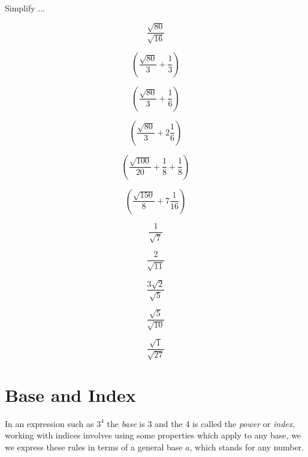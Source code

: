 Simplify ...

\begin{equation}
  \frac{\sqrt{80}}{\sqrt{16}}
\end{equation}

\begin{equation}
 \left ( \frac{\sqrt{80}}{3} + \frac{1}{3} \right)
\end{equation}

\begin{equation}
 \left ( \frac{\sqrt{80}}{3} + \frac{1}{6} \right)
\end{equation}

\begin{equation}
 \left (  \frac{\sqrt{80}}{3} + 2\frac{1}{6} \right )
\end{equation}

\begin{equation}
 \left (  \frac{\sqrt{100}}{20} + \frac{1}{8} + \frac{1}{8} \right )
\end{equation}

\begin{equation}
 \left (  \frac{\sqrt{150}}{8} + 7\frac{1}{16}\right )
\end{equation}

\begin{equation}
  \frac{1}{\sqrt{7}}
\end{equation}

\begin{equation}
  \frac{2}{\sqrt{11}}
\end{equation}

\begin{equation}
  \frac{3 \sqrt{2}}{\sqrt{5}}
\end{equation}

\begin{equation}
  \frac{\sqrt{5}}{\sqrt{10}}
\end{equation}

\begin{equation}
  \frac{\sqrt{1}}{\sqrt{27}}
\end{equation}

\section{Base and Index}

In an expression such as $ 3^{4} $ the \textit{base} is 3 and the 4 is called the \textit{power} or \textit{index}, working with indices involves using some properties which apply to any base, we we express these rules in terms of a general base $a$, which stands for any number.

